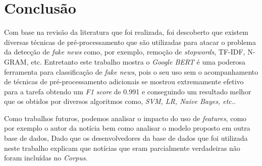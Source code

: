 \section{Conclusão}


Com base na revisão da literatura que foi realizada, foi descoberto que existem diversas técnicas de pré-processamento que são utilizadas para atacar o problema da detecção de \textit{fake news} como, por exemplo, remoção de \textit{stopwords}, TF-IDF, N-GRAM, etc. Entretanto este trabalho mostra o \textit{Google BERT} é uma poderosa ferramenta para classificação de \textit{fake news}, pois o seu uso sem o acompanhamento de técnicas de pré-processamento adicionais se mostrou extremamente efetivo para a tarefa obtendo um \textit{F1 score} de 0.991 e conseguindo um resultado melhor que os obtidos por diversos algoritmos como, \textit{SVM, LR, Naive Bayes, etc.}.


Como trabalhos futuros, podemos analisar o impacto do uso de \textit{features}, como por exemplo o autor da notícia bem como analisar o modelo proposto em outra base de dados, Dado que os desenvolvedores da base de dados que foi utilizada neste trabalho explicam que notícias que eram parcialmente verdadeiras não foram incluídas no \textit{Corpus}. 

